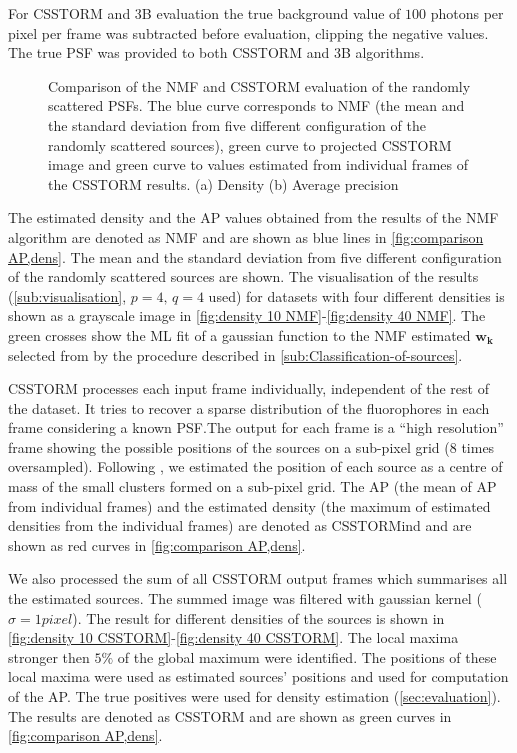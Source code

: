 For CSSTORM and 3B evaluation the true background value of $100$ photons per pixel per frame was subtracted before evaluation, clipping the negative values. The true PSF was provided to both CSSTORM and 3B algorithms. 

\begin{figure}[!h]
	\centering
	\newcommand{\sizef}{.38}
	
	\caption{Comparison of the NMF and CSSTORM evaluation of the randomly scattered PSFs. The blue curve corresponds to NMF (the mean and the standard deviation from five different configuration of the randomly scattered sources), green curve to projected CSSTORM image and green curve to values estimated from individual frames of the CSSTORM results. (a) Density (b) Average precision}
	\label{fig:comparison AP,dens}
\end{figure}
%
The estimated density and the AP values obtained from the results of the NMF algorithm are denoted as \textsf{NMF} and are shown as blue lines in \autoref{fig:comparison AP,dens}. The mean and the standard deviation from five different configuration of the randomly scattered sources are shown. The visualisation of the results (\autoref{sub:visualisation}, $p=4,\,q=4$ used) for datasets with four different densities is shown as a grayscale image in \autoref{fig:density 10 NMF}-\ref{fig:density 40 NMF}. The green crosses show the ML fit of a gaussian function to the NMF estimated $\bm{w_{k}}$ selected from by the procedure described in \autoref{sub:Classification-of-sources}.

CSSTORM processes each input frame individually, independent of the rest of the dataset. It tries to recover a sparse distribution of the fluorophores in each frame considering a known PSF.The output for each frame is a ``high resolution'' frame showing the possible positions of the sources on a sub-pixel grid (8 times oversampled). Following \cite{Zhu2012}, we estimated the position of each source as a centre of mass of the small clusters formed on a sub-pixel grid. The AP (the mean of AP from individual frames) and the estimated density (the maximum of estimated densities from the individual frames) are denoted as \textsf{CSSTORMind} and are shown as red curves in \autoref{fig:comparison AP,dens}.

We also processed the sum of all CSSTORM output frames which summarises all the estimated sources. The summed image was filtered with gaussian kernel ($\sigma=1\unit{pixel}$). The result for different densities of the sources is shown in \autoref{fig:density 10 CSSTORM}-\ref{fig:density 40 CSSTORM}. The local maxima stronger then $5\%$ of the global maximum were identified. The positions of these local maxima were used as estimated sources' positions and used for computation of the AP. The true positives were used for density estimation (\autoref{sec:evaluation}). The results are denoted as \textsf{CSSTORM} and are shown as green curves in \autoref{fig:comparison AP,dens}.

